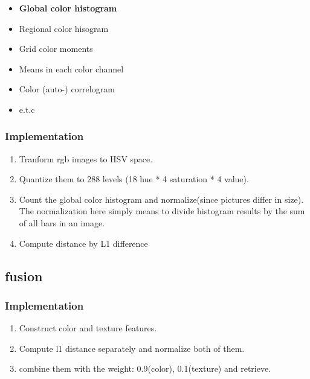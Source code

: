 \documentclass{article}
\begin{document}
\subsubsection{}
\begin{itemize}
  \item \textbf{Global color histogram}
  \item Regional color hisogram
  \item Grid color moments
  \item Means in each color channel
  \item Color (auto-) correlogram
  \item e.t.c
\end{itemize}

\subsubsection{Implementation}
\begin{enumerate}[{Step}~1:]

\item Tranform rgb images to HSV space.

\item Quantize them to 288 levels (18 hue * 4 saturation * 4 value).

\item Count the global color histogram and normalize(since pictures differ in size).
The normalization here simply means to divide histogram results by the sum of all bars in an image.

\item Compute distance by L1 difference
\end{enumerate}

\subsection{fusion}

\subsubsection{Implementation}
\begin{enumerate}[{Step}~1:]
\item Construct color and texture features.
\item Compute l1 distance separately and normalize both of them.
\item combine them with the weight: 0.9(color), 0.1(texture) and retrieve.
\end{enumerate}
\end{document}
